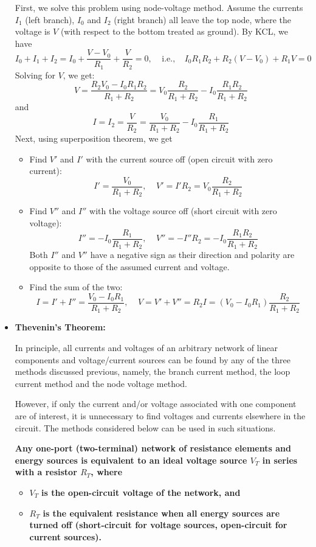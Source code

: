 \begin{itemize}
First, we solve this problem using node-voltage method. Assume the currents
$I_1$ (left branch), $I_0$ and $I_2$ (right branch) all leave the top node,
where the voltage is $V$ (with respect to the bottom treated as ground). 
By KCL, we have
\[ I_0+I_1+I_2=I_0+\frac{V-V_0}{R_1}+\frac{V}{R_2}=0,\;\;\;\;\mbox{i.e.,}\;\;\;\;
I_0R_1R_2+R_2(V-V_0)+R_1V=0 \]
Solving for $V$, we get:
\[ V=\frac{R_2V_0-I_0R_1R_2}{R_1+R_2}
  =V_0\frac{R_2}{R_1+R_2}-I_0\frac{R_1R_2}{R_1+R_2} \]
and
\[ I=I_2=\frac{V}{R_2}=\frac{V_0}{R_1+R_2}-I_0\frac{R_1}{R_1+R_2} \]
Next, using superposition theorem, we get
\begin{itemize}
\item Find $V'$ and $I'$ with the current source off (open circuit with zero 
  current):
  \[ I'=\frac{V_0}{R_1+R_2},\;\;\;\;V'=I'R_2=V_0\frac{R_2}{R_1+R_2} \]
\item Find $V''$ and $I''$ with the voltage source off (short circuit with 
  zero voltage):
  \[ I''=-I_0\frac{R_1}{R_1+R_2},\;\;\;\;V''=-I''R_2=-I_0\frac{R_1R_2}{R_1+R_2} \]
  Both $I''$ and $V''$ have a negative sign as their direction and polarity are
  opposite to those of the assumed current and voltage.  
\item Find the sum of the two:
  \[ I=I'+I''=\frac{V_0-I_0R_1}{R_1+R_2},\;\;\;\;
  V=V'+V''=R_2I=(V_0-I_0R_1)\frac{R_2}{R_1+R_2}	\]
\end{itemize}

\item {\bf Thevenin's Theorem:}

In principle, all currents and voltages of an arbitrary network of linear 
components and voltage/current sources can be found by any of the three methods 
discussed previous, namely, the branch current method, the loop current method 
and the node voltage method.

However, if only the current and/or voltage associated with one component 
are of interest, it is unnecessary to find voltages and currents elsewhere
in the circuit. The methods considered below can be used in such situations.

{\bf Any one-port (two-terminal) network of resistance elements and energy 
sources is equivalent to an ideal voltage source $V_T$ in series with a 
resistor $R_T$, where}
\begin{itemize}
\item $V_T$ {\bf is the open-circuit voltage of the network, and}
\item $R_T$ {\bf is the equivalent resistance when all energy sources are turned
off (short-circuit for voltage sources, open-circuit for current sources).}
\end{itemize}


\end{itemize}
